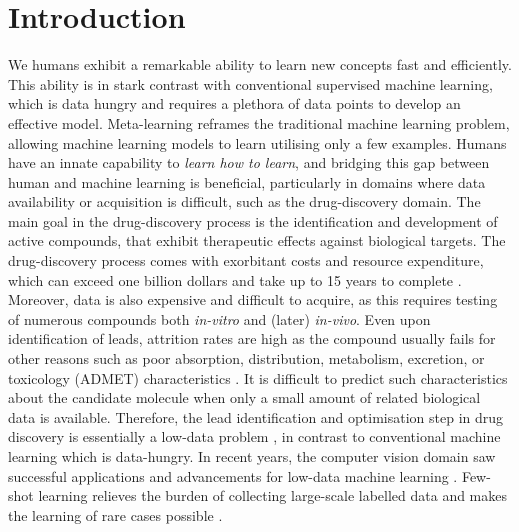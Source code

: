 \section{Introduction}

We humans exhibit a remarkable ability to learn new concepts fast and efficiently. This ability is in stark contrast with conventional supervised machine learning, which is data hungry and requires a plethora of data points to develop an effective model. Meta-learning reframes the traditional machine learning problem, allowing machine learning models to learn utilising only a few examples. Humans have an innate capability to \textit{learn how to learn}, and bridging this gap between human and machine learning is beneficial, particularly in domains where data availability or acquisition is difficult, such as the drug-discovery domain. The main goal in the drug-discovery process is the identification and development of active compounds, that exhibit therapeutic effects against biological targets. The drug-discovery process comes with exorbitant costs and resource expenditure, which can exceed one billion dollars and take up to 15 years to complete \cite{hughes2011principles}. Moreover, data is also expensive and difficult to acquire, as this requires testing of numerous compounds both \textit{in-vitro} and (later) \textit{in-vivo}. Even upon identification of leads, attrition rates are high as the compound usually fails for other reasons such as poor absorption, distribution, metabolism, excretion, or toxicology (ADMET) characteristics \cite{waring2015analysis}. It is difficult to predict such characteristics about the candidate molecule when only a small amount of related biological data is available. Therefore, the lead identification and optimisation step in drug discovery is essentially a low-data problem \cite{altae2017low}, in contrast to conventional machine learning which is data-hungry. In recent years, the computer vision domain saw successful applications and advancements for low-data machine learning \cite{koch2015siamese, vinyals2016matching, snell2017prototypical, sung2018learning}. Few-shot learning relieves the burden of collecting large-scale labelled data and makes the learning of rare cases possible \cite{wang2020generalizing}. 

